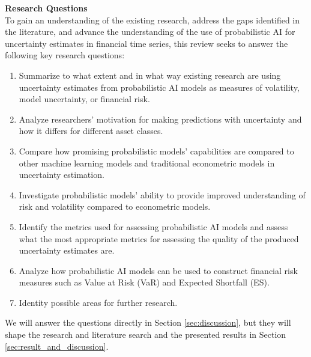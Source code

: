 \textbf{Research Questions}\\
To gain an understanding of the existing research, address the gaps identified in the literature, and advance the understanding of the use of probabilistic AI for uncertainty estimates in financial time series, this review seeks to answer the following key research questions: 
\begin{enumerate}[label=RQ\arabic*:]
    \item Summarize to what extent and in what way existing research are using uncertainty estimates from probabilistic AI models as measures of volatility, model uncertainty, or financial risk.
    \item Analyze researchers' motivation for making predictions with uncertainty and how it differs for different asset classes.
    \item Compare how promising probabilistic models' capabilities are compared to other machine learning models and traditional econometric models in uncertainty estimation.
    \item Investigate probabilistic models' ability to provide improved understanding of risk and volatility compared to econometric models.
    \item Identify the metrics used for assessing probabilistic AI models and assess what the most appropriate metrics for assessing the quality of the produced uncertainty estimates are.
    \item Analyze how probabilistic AI models can be used to construct financial risk measures such as Value at Risk (VaR) and Expected Shortfall (ES).
    \item Identity possible areas for further research.
\end{enumerate}

We will answer the questions directly in Section \ref{sec:discussion}, but they will shape the research and literature search and the presented results in Section \ref{sec:result_and_discussion}. 

